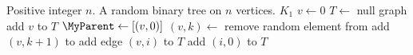 
\begin{algorithmic}[1]
\Require Positive integer $n$.
\Ensure A random binary tree on $n$ vertices.
  \State \Return $K_1$
\EndIf
\State $v \gets 0$
\State $T \gets$ null graph
\State add $v$ to $T$
\State $\MyParent \gets [(v,0)]$
  \State $(v,k) \gets$ remove random element from \MyParent
    \State add $(v, k+1)$ to \MyParent
  \EndIf
  \State add edge $(v, i)$ to $T$
  \State add $(i, 0)$ to \MyParent
\EndFor
\State \Return $T$
\end{algorithmic}
